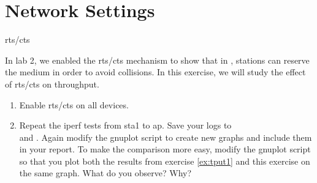 \section{Network Settings}
\begin{exercise}{\acs{rts}/\acs{cts}}

In lab 2, we enabled the \ac{rts}/\ac{cts} mechanism to show that in \wifi, stations can reserve the medium in order to avoid collisions. In this exercise, we will study the effect of \ac{rts}/\ac{cts} on throughput.

\begin{enumerate}
	\item Enable \ac{rts}/\ac{cts} on all devices.\newline
	\item Repeat the iperf tests from \ac{sta}1 to \ac{ap}. Save your logs to \\ and . Again modify the gnuplot script to create new graphs and include them in your report. To make the comparison more easy, modify the gnuplot script so that you plot both the results from exercise \ref{ex:tput1} and this exercise on the same graph. What do you observe? Why?\newline
	\begin{esolution}
	\end{esolution}

\end{enumerate}

\end{exercise}

